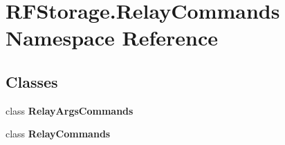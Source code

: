 \section{R\+F\+Storage.\+Relay\+Commands Namespace Reference}
\label{namespace_r_f_storage_1_1_relay_commands}
\subsection*{Classes}
\begin{DoxyCompactItemize}
\item 
class \textbf{ Relay\+Args\+Commands}
\item 
class \textbf{ Relay\+Commands}
\end{DoxyCompactItemize}
